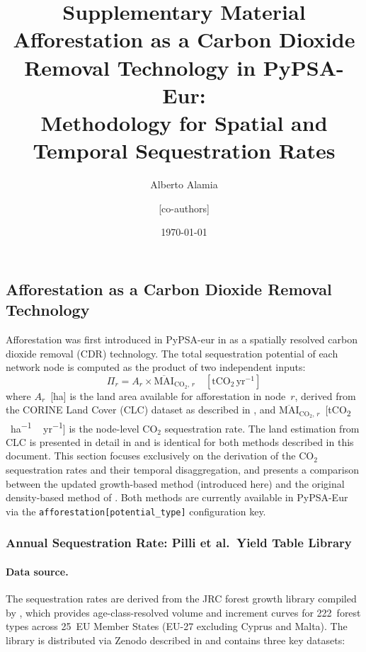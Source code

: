 \documentclass[12pt, a4paper]{article}
\title{%
    \textbf{Supplementary Material}\\[0.5em]
    \large Afforestation as a Carbon Dioxide Removal Technology in PyPSA-Eur:\\
    Methodology for Spatial and Temporal Sequestration Rates
}
\author{Alberto Alamia \and [co-authors]}
\date{\today}
\begin{document}
\maketitle
\tableofcontents
\newpage

\subsection{Afforestation as a Carbon Dioxide Removal Technology}
\label{sec:afforestation_methodology}

Afforestation was first introduced in PyPSA-eur in \cite{Fernandes2026} as a spatially resolved carbon dioxide removal (CDR) technology. The total sequestration potential of each network node is computed as the product of two independent inputs:
\begin{equation}
    \Pi_r = A_r \times \overline{\text{MAI}}_{\text{CO}_2,\, r}
    \quad [\text{tCO}_2\,\text{yr}^{-1}]
    \label{eq:node_potential}
\end{equation}
where $A_r$~[\si{ha}] is the land area available for afforestation in node~$r$, derived from the CORINE Land Cover (CLC) dataset as described in \citet{Fernandes2026}, and $\overline{\text{MAI}}_{\text{CO}_2,\,r}$~[\si{tCO_2\,ha^{-1}\,yr^{-1}}] is the node-level CO$_2$ sequestration rate. The land estimation from CLC is presented in detail in \citet{Fernandes2026} and is identical for both methods described in this document. This section focuses exclusively on the derivation of the CO$_2$ sequestration rates and their temporal disaggregation, and presents a comparison between the updated growth-based method (introduced here) and the original density-based method of \citet{Fernandes2026}. Both methods are currently available in PyPSA-Eur via the \texttt{afforestation[potential\_type]} configuration key.

\subsubsection{Annual Sequestration Rate: Pilli et al.\ Yield Table Library}
\label{sec:affo_rate}

\paragraph{Data source.}
The sequestration rates are derived from the JRC forest growth library compiled by \citet{Pilli2024}, which provides age-class-resolved volume and increment
curves for 222~forest types across 25~EU Member States (EU-27 excluding Cyprus
and Malta). The library is distributed via Zenodo
\cite{Pilli2024Zenodo} described in \cite{Pilli2024} and contains three key datasets:
\end{document}
